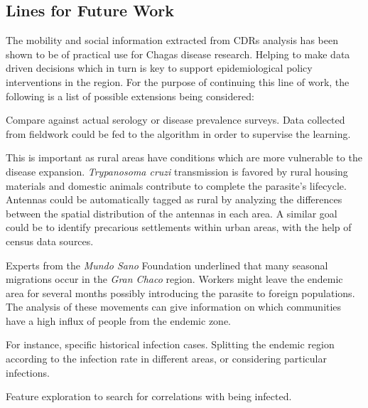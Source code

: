 \subsection{Lines for Future Work}

The mobility and social information extracted from CDRs analysis has been shown to be of practical use for Chagas disease research. Helping to make data driven decisions which in turn is key to support epidemiological policy interventions in the region. For the purpose of continuing this line of work, the following is a list of possible extensions being considered:

\begin{description}
	\item [Results validation.] Compare against actual serology or disease prevalence surveys. Data collected from fieldwork could be fed to the algorithm in order to supervise the learning.

	\item [Differentiating rural antennas from urban ones.] This is important as rural areas have conditions which are more vulnerable to the disease expansion. \textit{Trypanosoma cruzi} transmission is favored by rural housing materials and domestic animals contribute to complete the parasite's lifecycle. Antennas could be automatically tagged as rural by analyzing the differences between the spatial distribution of the antennas in each area. A similar goal could be to identify precarious settlements within urban areas, with the help of census data sources.

	\item [Seasonal migration analysis.] Experts from the \textit{Mundo Sano} Foundation underlined that many seasonal migrations occur in the \textit{Gran Chaco} region.
	Workers might leave the endemic area for several months possibly introducing the parasite to foreign populations.
	The analysis of these movements can give information on which communities have a high influx of people from the endemic zone.

	\item [Search for epidemiological data at a finer grain.] For instance, specific historical infection cases. Splitting the endemic region according to the infection rate in different areas, or considering particular infections.
	\item Feature exploration to search for correlations with being infected.
\end{description}

